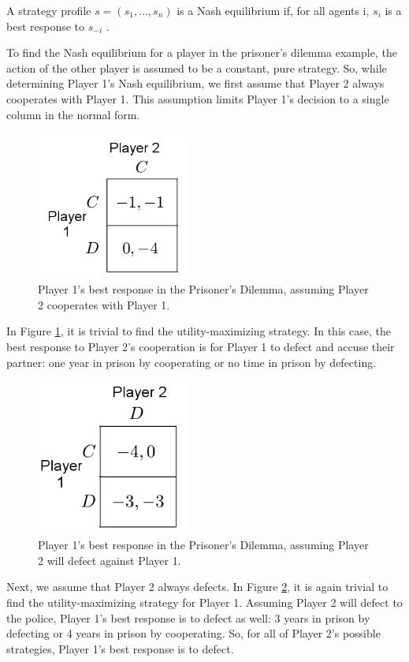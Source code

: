 \begin{define}
  A strategy profile $s=(s_1,\dots ,s_n)$ is a Nash equilibrium if, for all agents i, $s_i$ is a best response to $s_{-i}$ \cite{shoh09}.
\end{define}

To find the Nash equilibrium for a player in the prisoner's dilemma example, the action of the other player is assumed to be a constant, pure strategy. So, while determining Player 1's Nash equilibrium, we first assume that Player 2 always cooperates with Player 1. This assumption limits Player 1's decision to a single column in the normal form.
\begin{figure}[H]
  \centering
  \includegraphics[width=5cm]{figures/ExamplePartialCol1.png}
  \caption{Player 1's best response in the Prisoner's Dilemma, assuming Player 2 cooperates with Player 1.}
  \label{fig:NashCol1}
\end{figure}

In Figure \ref{fig:NashCol1}, it is trivial to find the utility-maximizing strategy. In this case, the best response to Player 2's cooperation is for Player 1 to defect and accuse their partner: one year in prison by cooperating or no time in prison by defecting.\\

\begin{figure}[H]
  \centering
  \includegraphics[width=5cm]{figures/ExamplePartialCol2.png}
  \caption{Player 1's best response in the Prisoner's Dilemma, assuming Player 2 will defect against Player 1.}
  \label{fig:NashCol2}
\end{figure}
Next, we assume that Player 2 always defects. In Figure \ref{fig:NashCol2}, it is again trivial to find the utility-maximizing strategy for Player 1. Assuming Player 2 will defect to the police, Player 1's best response is to defect as well: 3 years in prison by defecting or 4 years in prison by cooperating. So, for all of Player 2's possible strategies, Player 1's best response is to defect.\\

